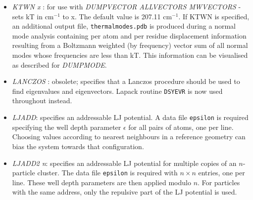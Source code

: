 \documentclass[12pt,a4paper,dvips]{article}
\begin{document}
\begin{itemize}
\item {\it KTWN x \/}: for use with {\it DUMPVECTOR ALLVECTORS MWVECTORS} - sets kT in cm$^{-1}$ to x. The default value is 207.11 cm$^{-1}$. If KTWN is specified, an additional output file, {\tt thermalmodes.pdb} is produced during a normal mode analysis containing per atom and per residue displacement information resulting from a Boltzmann weighted (by frequency) vector sum of all normal modes whose frequencies are less than kT. This information can be visualised as described for {\it DUMPMODE}.

\item {\it LANCZOS \/}: obsolete; specifies that a Lanczos procedure should be used to
find eigenvalues and eigenvectors. 
Lapack routine {\tt DSYEVR} is now used throughout instead.

\item {\it LJADD\/}: specifies an addressable LJ potential. A data file {\tt epsilon} is required
specifying the well depth parameter $\epsilon$ for all pairs of atoms, one per line.
Choosing values according to nearest neighbours in a reference geometry can bias the
system towards that configuration.

\item {\it LJADD2 n\/}: specifies an addressable LJ potential for multiple copies of an $n$-particle
cluster. The data file {\tt epsilon} is required
with $n\times n$ entries, one per line. These well depth parameters are then applied modulo $n$.
For particles with the same address, only the repulsive part of the LJ potential is used.


\end{itemize}
\end{document}
